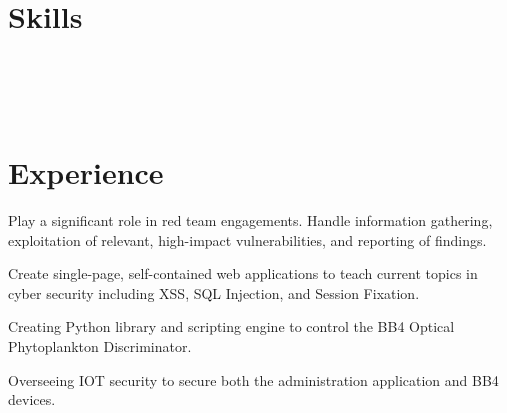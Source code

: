 \documentclass[]{deedy-resume-openfont}
\begin{document}
\hfill
\begin{minipage}[t]{0.70\textwidth} 


\section{Skills}
 \\
\sectionsep
{} \\
\sectionsep
{} \\
\sectionsep


\section{Experience}

\vspace{\topsep} 
\begin{tightemize}
\item Play a significant role in red team engagements. Handle information gathering, exploitation of relevant, high-impact vulnerabilities, and reporting of findings.
\item Create single-page, self-contained web applications to teach current topics in cyber security including XSS, SQL Injection, and Session Fixation.
\end{tightemize}
\sectionsep

\vspace{\topsep}
\begin{tightemize}
\item Creating Python library and scripting engine to control the BB4 Optical Phytoplankton Discriminator.
\item Overseeing IOT security to secure both the administration application and BB4 devices.
\end{tightemize}
\sectionsep


\end{minipage}
\end{document}

